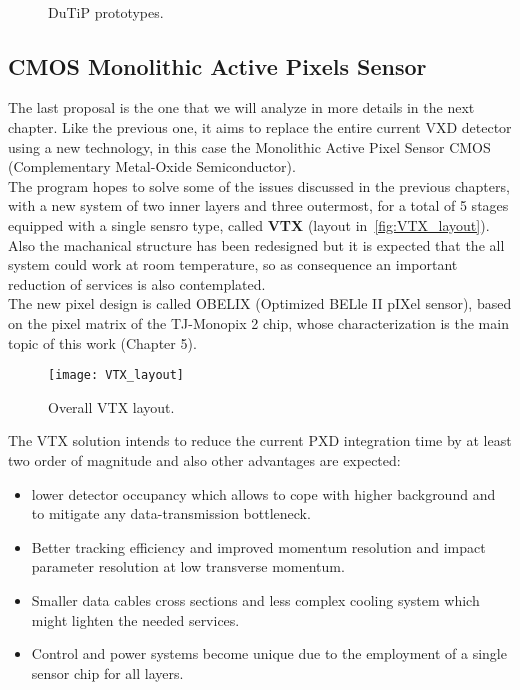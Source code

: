 \begin{figure}[h!]
\centering
{}\quad
{}\\
\caption{DuTiP prototypes.}
\label{fig:dutip_matrix}
\end{figure}


\subsection{CMOS Monolithic Active Pixels Sensor}

The last proposal is the one that we will analyze in more details in the next chapter. Like the previous one, it aims to replace the entire current VXD detector using a new technology, in this case the Monolithic Active Pixel Sensor CMOS (Complementary Metal-Oxide Semiconductor). \\
The program hopes to solve some of the issues discussed in the previous chapters, with a new system of two inner layers and three outermost, for a total of 5 stages equipped with a single sensro type, called \textbf{VTX} (layout in~\autoref{fig:VTX_layout}). Also the machanical structure has been redesigned but it is expected that the all system could work at room temperature, so as consequence an important reduction of services is also contemplated.\\
The new pixel design is called OBELIX (Optimized BELle II pIXel sensor), based on the pixel matrix of the TJ-Monopix 2 chip, whose characterization is the main topic of this work (Chapter 5). 

\begin{figure}[h!]
\centering
\texttt{[image: VTX\_layout]}
\caption{Overall VTX layout.}
\label{fig:VTX_layout}
\end{figure}

The VTX solution intends to reduce the current PXD integration time by at least two order of magnitude and also other advantages are expected:

\begin{itemize}
\item lower detector occupancy which allows to cope with higher background and to mitigate any data-transmission bottleneck.
\item Better tracking efficiency and improved momentum resolution and impact parameter resolution at low transverse momentum.
\item Smaller data cables cross sections and less complex cooling system which might lighten the needed services.
\item Control and power systems become unique due to the employment of a single sensor chip for all layers.
\end{itemize}

